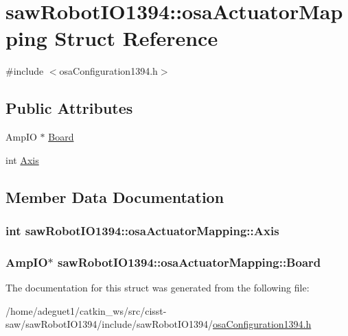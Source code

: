 \hypertarget{structsaw_robot_i_o1394_1_1osa_actuator_mapping}{\section{saw\-Robot\-I\-O1394\-:\-:osa\-Actuator\-Mapping Struct Reference}
\label{structsaw_robot_i_o1394_1_1osa_actuator_mapping}
}


{\ttfamily \#include $<$osa\-Configuration1394.\-h$>$}

\subsection*{Public Attributes}
\begin{DoxyCompactItemize}
\item 
Amp\-I\-O $\ast$ \hyperlink{structsaw_robot_i_o1394_1_1osa_actuator_mapping_a46217ef1c3c396fdff23c6ecae8882ee}{Board}
\item 
int \hyperlink{structsaw_robot_i_o1394_1_1osa_actuator_mapping_aaa80a5cc2889109698ba033f0bbc39c5}{Axis}
\end{DoxyCompactItemize}


\subsection{Member Data Documentation}
\hypertarget{structsaw_robot_i_o1394_1_1osa_actuator_mapping_aaa80a5cc2889109698ba033f0bbc39c5}{
\subsubsection[{Axis}]{\setlength{\rightskip}{0pt plus 5cm}int saw\-Robot\-I\-O1394\-::osa\-Actuator\-Mapping\-::\-Axis}}\label{structsaw_robot_i_o1394_1_1osa_actuator_mapping_aaa80a5cc2889109698ba033f0bbc39c5}
\hypertarget{structsaw_robot_i_o1394_1_1osa_actuator_mapping_a46217ef1c3c396fdff23c6ecae8882ee}{
\subsubsection[{Board}]{\setlength{\rightskip}{0pt plus 5cm}Amp\-I\-O$\ast$ saw\-Robot\-I\-O1394\-::osa\-Actuator\-Mapping\-::\-Board}}\label{structsaw_robot_i_o1394_1_1osa_actuator_mapping_a46217ef1c3c396fdff23c6ecae8882ee}


The documentation for this struct was generated from the following file\-:\begin{DoxyCompactItemize}
\item 
/home/adeguet1/catkin\-\_\-ws/src/cisst-\/saw/saw\-Robot\-I\-O1394/include/saw\-Robot\-I\-O1394/\hyperlink{osa_configuration1394_8h}{osa\-Configuration1394.\-h}\end{DoxyCompactItemize}
